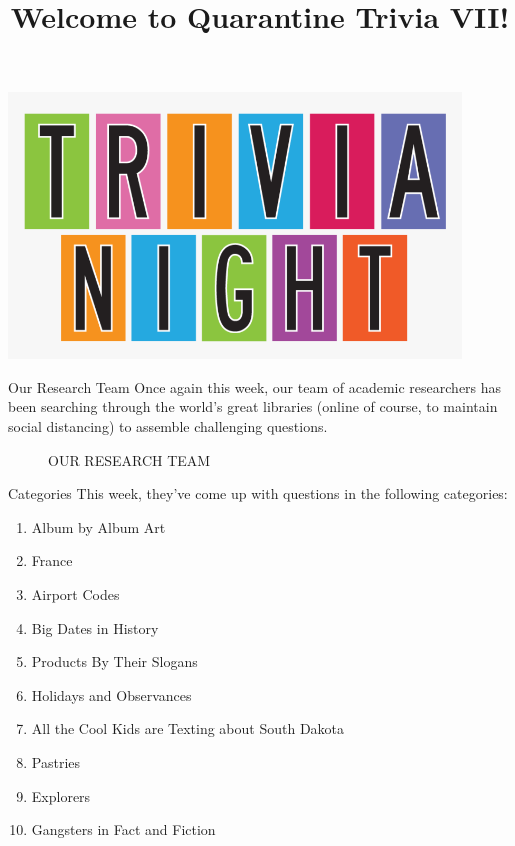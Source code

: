 \documentclass[11pt]{beamer}
\begin{document}
\title{Welcome to Quarantine Trivia VII!\vspace{-0.5in}}
\date{}

\begin{frame}
\titlepage{}
\begin{center}
\includegraphics[max width=0.9\textwidth,
    max height=0.4\textheight]{Images/triviatitleframelogo.png}
\end{center}
\end{frame}

\begingroup{}
\begin{frame}[t]{Our Research Team}
Once again this week, our team of academic researchers has been searching through the
world's great libraries (online of course, to maintain social distancing) to assemble
challenging questions.\par%
\pause{}
\begin{center}
\begin{figure}[h]
\caption*{OUR RESEARCH TEAM}
\end{figure}
\end{center}
\end{frame}
\endgroup{}

\begingroup{}
\begin{frame}[t]{Categories}
This week, they've come up with questions in the following categories:
\begin{enumerate}
\item Album by Album Art
\item France
\item Airport Codes
\item Big Dates in History
\item Products By Their Slogans
\item Holidays and Observances
\item All the Cool Kids are Texting about South Dakota
\item Pastries
\item Explorers
\item Gangsters in Fact and Fiction
\end{enumerate}
\end{frame}
\endgroup{}
\end{document}
